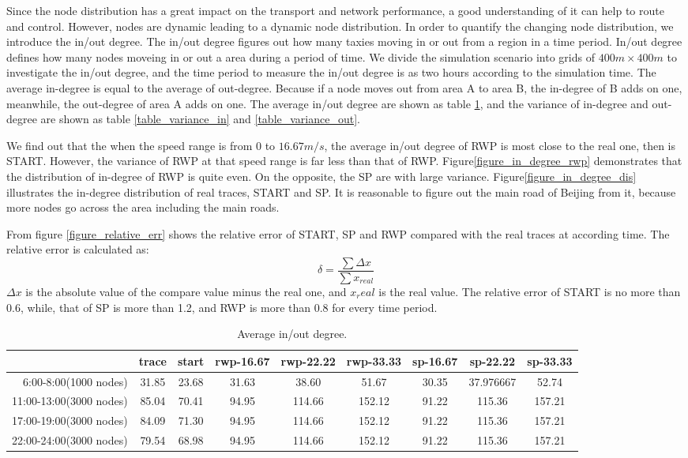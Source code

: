 Since the node distribution has a great impact on the transport and network performance, a good understanding of it can help to route and control.  However, nodes are dynamic leading to a dynamic node distribution. In order to quantify the changing node distribution,  we introduce the in/out degree. The in/out degree figures out how many taxies moving in or out from a region in a time period. In/out degree defines how many nodes moveing in or out a area during a period of time. 
We divide the simulation scenario into grids of $ 400m \times 400 m$ to investigate the in/out degree, and the time period to measure the in/out degree is as two hours according to the simulation time. 
The average in-degree is equal to the average of out-degree. Because if a node moves out from area A to area B, the in-degree of B adds on one, meanwhile, the out-degree of area A adds on one. The average in/out degree are shown as table \ref{table_avg_inoutdegree}, and the variance of in-degree and out-degree are shown as table \ref{table_variance_in} and \ref{table_variance_out}.

We find out that the when the speed range is from 0 to $16.67m/s$, the average in/out degree of RWP is most close to the real one, then is START. However, the variance of RWP at that speed range is far less than that of RWP. Figure\ref{figure_in_degree_rwp} demonstrates that the distribution of in-degree of RWP
is quite even. On the opposite, the SP are with large variance.  Figure\ref{figure_in_degree_dis} illustrates the in-degree distribution of real traces, START and SP. It is reasonable to figure out the main road of Beijing from it, because more nodes go across the area including the main roads.

From figure \ref{figure_relative_err} shows the relative error of START, SP and RWP compared with the real traces at according time.
The relative error is calculated as:
\begin{equation}
    \delta = \frac{\sum \Delta x}{\sum x_{real}} 
\end{equation}
$\Delta x$ is the absolute value of the compare value minus the real one, and $x_real$ is the real value.
The relative error of START is no more than 0.6, while, that of SP is more than 1.2,  and RWP is more than 0.8 for every time period. 
\begin{table}[!t]
\caption{Average in/out degree.}\label{table_avg_inoutdegree}
\centering
\begin{tabular}{r|c|c|c|c|c|c|c|c}
\hline
	&trace	&start	&rwp-16.67	&rwp-22.22	&rwp-33.33	&sp-16.67	&sp-22.22	&sp-33.33\\
\hline
6:00-8:00(1000 nodes)	&31.85&23.68&31.63&38.60&51.67&30.35&37.976667	&52.74\\
\hline
11:00-13:00(3000 nodes)	&85.04&70.41&94.95&114.66&152.12&91.22&115.36&157.21\\
\hline
17:00-19:00(3000 nodes)	&84.09&71.30&94.95&114.66&152.12&91.22&115.36&157.21\\
\hline
22:00-24:00(3000 nodes)	&79.54&68.98&94.95&114.66&152.12&91.22&115.36&157.21\\
\hline
\end{tabular}
\end{table}


